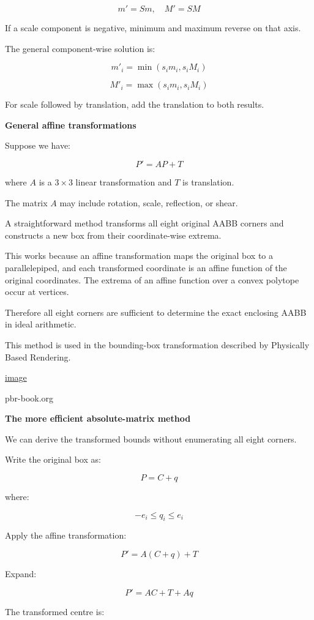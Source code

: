 \[
m'=Sm,\quad M'=SM
\]

If a scale component is negative, minimum and maximum reverse on that axis.

The general component-wise solution is:

\[
\boxed{ m'_i=\min(s_im_i,s_iM_i) }
\]

\[
\boxed{ M'_i=\max(s_im_i,s_iM_i) }
\]

For scale followed by translation, add the translation to both results.

\textbf{General affine transformations}

Suppose we have:

\[
\boxed{ P'=AP+T }
\]

where \(A\) is a \(3\times3\) linear transformation and \(T\) is translation.

The matrix \(A\) may include rotation, scale, reflection, or shear.

A straightforward method transforms all eight original AABB corners and constructs a new box from their coordinate-wise extrema.

This works because an affine transformation maps the original box to a parallelepiped, and each transformed coordinate is an affine function of the original coordinates. The extrema of an affine function over a convex polytope occur at vertices.

Therefore all eight corners are sufficient to determine the exact enclosing AABB in ideal arithmetic.

This method is used in the bounding-box transformation described by Physically Based Rendering. 

\href{https://www.google.com/s2/favicons?domain=https://www.pbr-book.org&sz=32}{image}

pbr-book.org

\textbf{The more efficient absolute-matrix method}

We can derive the transformed bounds without enumerating all eight corners.

Write the original box as:

\[
P=C+q
\]

where:

\[
-e_i\le q_i\le e_i
\]

Apply the affine transformation:

\[
P'=A(C+q)+T
\]

Expand:

\[
P'=AC+T+Aq
\]

The transformed centre is:

